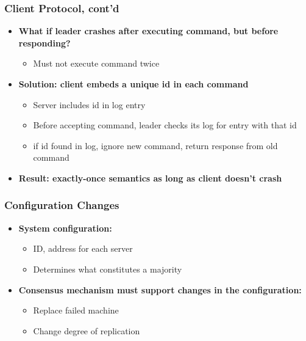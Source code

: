 \begin{frame}
    \frametitle{Client Protocol, cont'd}
    \begin{itemize}
        \item \textbf{What if leader crashes after executing command, but before responding?}
            \begin{itemize}
                \item Must not execute command twice
            \end{itemize}
        \item \textbf{Solution: client embeds a unique id in each command}
            \begin{itemize}
                \item Server includes id in log entry
                \item Before accepting command, leader checks its log for entry with that id
                \item if id found in log, ignore new command, return response from old command
            \end{itemize}
        \item \textbf{Result: exactly-once semantics as long as client doesn't crash}
    \end{itemize}
\end{frame}

\begin{frame}
    \frametitle{Configuration Changes}
    \begin{itemize}
        \item \textbf{System configuration:}
            \begin{itemize}
                \item ID, address for each server
                \item Determines what constitutes a majority
            \end{itemize}
        \item \textbf{Consensus mechanism must support changes in the configuration:}
            \begin{itemize}
                \item Replace failed machine
                \item Change degree of replication
            \end{itemize}
    \end{itemize}
\end{frame}

